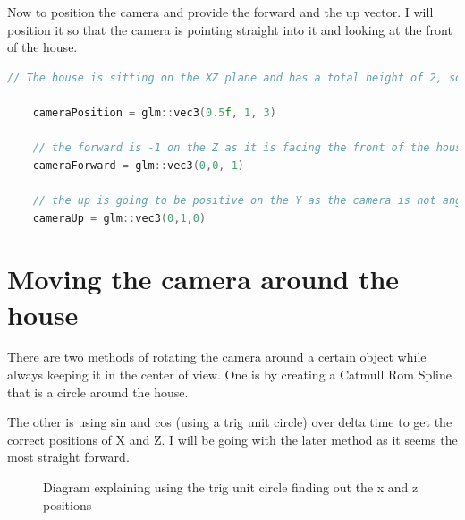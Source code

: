 \documentclass[10pt]{report}
\begin{document}
Now to position the camera and provide the forward and the up vector. I will position it so that the camera is pointing straight into it and looking at the front of the house.
\begin{lstlisting}[language = c]
    // The house is sitting on the XZ plane and has a total height of 2, so I placed the camera on the center with 1 on the Y axis. As the house goes from 0 to 1 on the X, I decided to place the camera in the center, this being 0.5. As the house already extrudes by 1 on the Z axis, I moved the camera back by 2 extra points to make sure that the house will fit into the FOV, making it 3 on the Z.

    cameraPosition = glm::vec3(0.5f, 1, 3) 

    // the forward is -1 on the Z as it is facing the front of the house that has a normal of (0,0,1)
    cameraForward = glm::vec3(0,0,-1) 

    // the up is going to be positive on the Y as the camera is not angled.
    cameraUp = glm::vec3(0,1,0) 
\end{lstlisting}

\section{Moving the camera around the house}
There are two methods of rotating the camera around a certain object while always keeping it in the center of view.
One is by creating a Catmull Rom Spline that is a circle around the house.

The other is using sin and cos (using a trig unit circle) over delta time to get the correct positions of X and Z. I will be going with the later method as it seems the most straight forward.

\begin{figure}[H]
    \centering
    \caption{Diagram explaining using the trig unit circle finding out the x and z positions}
\end{figure}
\end{document}
